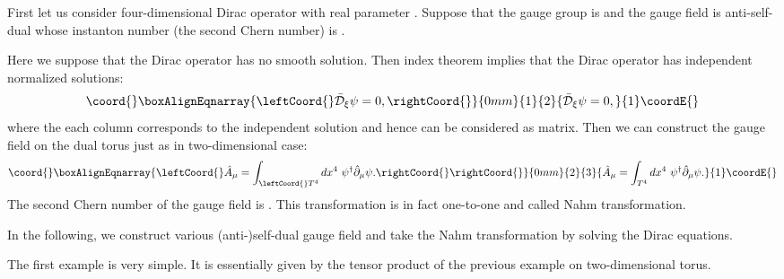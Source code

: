 \documentclass[a4paper,epsf,12pt]{article}
\providecommand{\cD}{{\cal D}}
\providecommand{\Ah}{\hat{A}}
\providecommand{\Th}{\hat{T}}
\providecommand{\delh}{\hat{\partial}}
\def \cD{{\cal D}}
\def \cDb{{\bar {\cal D}}}
\begin{document}
First let us consider four-dimensional Dirac operator
with real parameter \myHighlight{$\xi_\mu$}\coordHE{}.
Suppose that the gauge group is \coordHE{} and 
the gauge field is anti-self-dual whose instanton number \coordHE{}
(the second Chern number) is \coordHE{}.

Here we suppose that the Dirac operator \myHighlight{$\cD_\xi$}\coordHE{} has no smooth
solution.
Then index theorem implies that the Dirac operator \myHighlight{$\cDb_\xi$}\coordHE{} has independent
normalized \coordHE{} solutions:
\begin{eqnarray}\coord{}\boxAlignEqnarray{\leftCoord{}
\label{dirac_04}
\cDb_\xi \psi =0,
\rightCoord{}}{0mm}{1}{2}{
\cDb_\xi \psi =0,
}{1}\coordE{}\end{eqnarray}
where the each column corresponds to the independent \coordHE{} solution
and hence \myHighlight{$\psi$}\coordHE{} can be considered as \coordHE{} matrix.
Then we can construct the gauge field
on the dual torus \myHighlight{$\Th^4$}\coordHE{} just as in two-dimensional case:
\begin{eqnarray*}\coord{}\boxAlignEqnarray{\leftCoord{}
\Ah_\mu=\int_{\leftCoord{}T^4}dx^4~\psi^\dagger \delh_\mu \psi.\rightCoord{}
\rightCoord{}}{0mm}{2}{3}{
\Ah_\mu=\int_{T^4}dx^4~\psi^\dagger \delh_\mu \psi.
}{1}\coordE{}\end{eqnarray*}
The second Chern number of the gauge field \myHighlight{$\Ah$}\coordHE{} is \coordHE{}.
This transformation is in fact one-to-one
and called Nahm transformation.

In the following, we construct various (anti-)self-dual gauge field
and take the Nahm transformation by solving the Dirac equations.

\vspace{2mm}

The first example is very simple. It is essentially given by 
the tensor product of the previous example on two-dimensional torus. 
\end{document}
